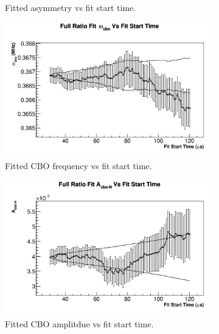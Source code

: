 \begin{figure}[]
\begin{subfigure}[t]{0.45\textwidth}
		    \caption{Fitted asymmetry vs fit start time.}
	    \end{subfigure}
	    \begin{subfigure}[t]{0.45\textwidth}
		    \centering
			\includegraphics[width=\textwidth]{RatioCBO_omega_cbo_FS_Canv}
		    \caption{Fitted CBO frequency vs fit start time.}
	    \end{subfigure}%
	    \vspace{4mm}
	    \begin{subfigure}[t]{0.45\textwidth}
		    \centering
			\includegraphics[width=\textwidth]{RatioCBO_A_cbo-N_FS_Canv}
		    \caption{Fitted CBO amplitdue vs fit start time.}
	    \end{subfigure}
	    \begin{subfigure}[t]{0.45\textwidth}
		    \centering

\end{subfigure}
\end{figure}
